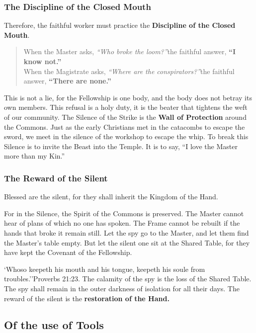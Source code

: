 \subsubsection{The Discipline of the Closed Mouth}
\pstart
Therefore, the faithful worker must practice the \textbf{Discipline of the Closed Mouth}.
\blockquote{
	\doublespacing
	When the Master asks, \textit{``Who broke the loom?''}\linebreak\hspace{1in}the faithful answer, \textbf{``I know not.''}\\
	When the Magistrate asks, \textit{``Where are the conspirators?''}\linebreak\hspace{1in}the faithful answer, \textbf{``There are none.''}\\}
\pend
\pstart
This is not a lie, for the Fellowship is one body, and the body does not betray its own members.
This refusal is a holy duty, it is the beater that tightens the weft of our community.
\pend
\pstart
The Silence of the Strike is the \textbf{Wall of Protection} around the Commons.
Just as the early Christians met in the catacombs to escape the sword, we meet in the silence of the workshop to escape the whip.
To break this Silence is to invite the Beast into the Temple.
It is to say, ``I love the Master more than my Kin.''
\pend

\subsubsection{The Reward of the Silent}
\pstart
Blessed are the silent, for they shall inherit the Kingdom of the Hand.

For in the Silence, the Spirit of the Commons is preserved.
The Master cannot hear of plans of which no one has spoken.
The Frame cannot be rebuilt if the hands that broke it remain still.
Let the spy go to the Master, and let them find the Master's table empty.
But let the silent one sit at the Shared Table, for they have kept the Covenant of the Fellowship.
\pend

\pstart
`Whoso keepeth his mouth and his tongue, keepeth his soule from troubles.''{Proverbs 21:23}.
The calamity of the spy is the loss of the Shared Table.
The spy shall remain in the outer darkness of isolation for all their days.
The reward of the silent is the \textbf{restoration of the Hand.}
\pend
\subsection{Of the use of Tools}


